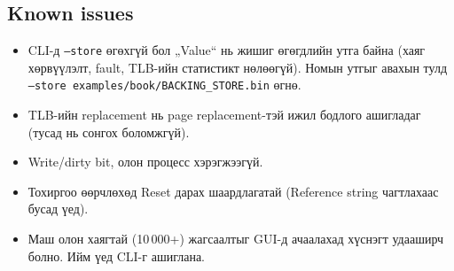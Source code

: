 \subsection{Known issues}
\begin{itemize}
\item CLI-д \texttt{--store} өгөхгүй бол „Value“ нь жишиг өгөгдлийн утга байна (хаяг хөрвүүлэлт, fault, TLB-ийн статистикт нөлөөгүй). Номын утгыг авахын тулд \texttt{--store examples/book/BACKING\_STORE.bin} өгнө.
\item TLB-ийн replacement нь page replacement-тэй ижил бодлого ашигладаг (тусад нь сонгох боломжгүй).
\item Write/dirty bit, олон процесс хэрэгжээгүй.
\item Тохиргоо өөрчлөхөд Reset дарах шаардлагатай (Reference string чагтлахаас бусад үед).
\item Маш олон хаягтай (10\,000+) жагсаалтыг GUI-д ачаалахад хүснэгт удааширч болно. Ийм үед CLI-г ашиглана.
\end{itemize}

